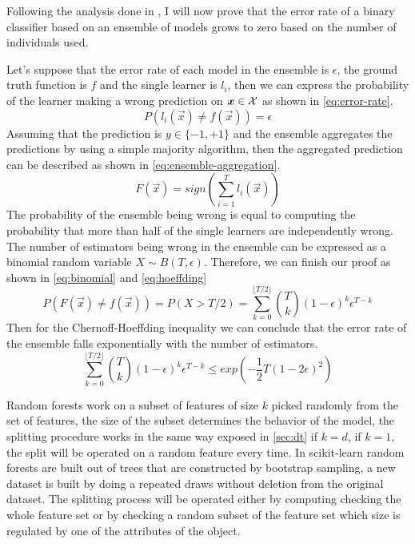 \medskip

Following the analysis done in \cite{ZhouZhi-Hua2021ML}, I will now prove that the error rate of a
binary classifier based on an ensemble of models grows to zero based on the number of individuals
used.

Let's suppose that the error rate of each model in the ensemble is $\epsilon$, the ground truth
function is $f$ and the single learner is $l_i$, then we can express the probability of the learner
making a wrong prediction on $\boldsymbol{x} \in \mathcal{X}$ as shown in \cref{eq:error-rate}.
\begin{equation}
	\label{eq:error-rate}
	P(l_i(\vec{x}) \neq f(\vec{x})) = \epsilon
\end{equation}
Assuming that the prediction is $y \in \{-1, +1\}$ and the ensemble aggregates the predictions by
using a simple majority algorithm, then the aggregated prediction can be described as shown in
\cref{eq:ensemble-aggregation}.
\begin{equation}
	\label{eq:ensemble-aggregation}
	F(\vec{x}) = sign\left(\sum_{i = 1}^{T}l_i(\vec{x})\right)
\end{equation}
The probability of the ensemble being wrong is equal to computing the probability that more than
half of the single learners are independently wrong. The number of estimators being wrong in the
ensemble can be expressed as a binomial random variable $X \sim B(T, \epsilon)$. Therefore, we can finish our proof as shown in \cref{eq:binomial} and \cref{eq:hoeffding}
\begin{equation}
	\label{eq:binomial}
	P(F(\vec{x}) \neq f(\vec{x})) = P(X > T / 2) = \sum_{k = 0}^{\lfloor T / 2 \rfloor}\binom{T}{k} (1 -
	\epsilon)^k\epsilon^{T - k}
\end{equation}
Then for the Chernoff-Hoeffding inequality we can conclude that the error rate of the ensemble falls
exponentially with the number of estimators.
\begin{equation}
	\label{eq:hoeffding}
	\sum_{k = 0}^{\lfloor T / 2 \rfloor}\binom{T}{k} (1 - \epsilon)^k\epsilon^{T - k} \leq
	exp\left(-\frac{1}{2}T(1 - 2\epsilon)^2\right)
\end{equation}

Random forests work on a subset of features of size $k$ picked randomly from the set of features,
the size of the subset determines the behavior of the model, the splitting procedure works in the
same way exposed in \cref{sec:dt} if $k = d$, if $k = 1$, the split will be operated on a random
feature every time. In scikit-learn random forests are built out of trees that are constructed by
bootstrap sampling, a new dataset is built by doing a repeated draws without deletion from the
original dataset. The splitting process will be operated either by computing checking the whole
feature set or by checking a random subset of the feature set which size is regulated by one of the
attributes of the object.

